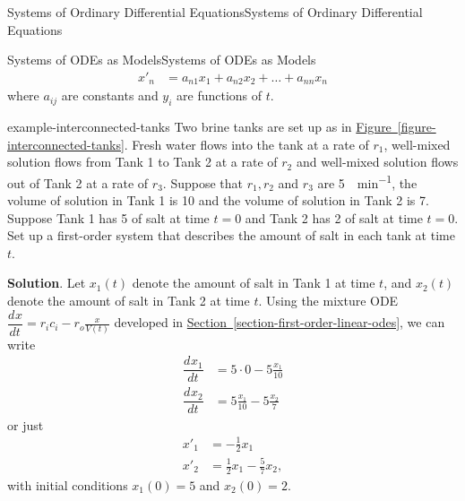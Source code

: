 \documentclass[10pt,]{book}
\numberwithin{equation}{section}
\newcommand{\dv}[3][]{\dfrac{d^{#1} #2}{d #3^{#1}}}
\newcommand{\amp}{&}
\begin{document}
\begin{chapterptx}{Systems of Ordinary Differential Equations}{}{Systems of Ordinary Differential Equations}{}{}
\begin{sectionptx}{Systems of ODEs as Models}{}{Systems of ODEs as Models}{}{}
\begin{align*}
x'_{n}  \amp=  a_{n1}x_{1} + a_{n2}x_{2} + \dots + a_{nn}x_{n}
\end{align*}
where \(a_{ij}\) are constants and \(y_{i}\) are functions of \(t\).%
\begin{example}{}{example-interconnected-tanks}%
\hypertarget{p-301}{}%
Two brine tanks are set up as in \hyperref[figure-interconnected-tanks]{Figure~\ref{figure-interconnected-tanks}}. Fresh water flows into the tank at a rate of \(r_{1}\), well-mixed solution flows from Tank 1 to Tank 2 at a rate of \(r_{2}\) and well-mixed solution flows out of Tank 2 at a rate of \(r_{3}\). Suppose that \(r_{1}, r_{2}\) and  \(r_{3}\) are \SI{5}{\gallon\per\minute}, the volume of solution in Tank 1 is \SI{10}{\gallon} and the volume of solution in Tank 2 is \SI{7}{\gallon}. Suppose Tank 1 has \SI{5}{\pound} of salt at time \(t=0\) and Tank 2 has \SI{2}{\pound} of salt at time \(t=0\). Set up a first-order system that describes the amount of salt in each tank at time \(t\).%
\par\smallskip%
\noindent\textbf{Solution}.\hypertarget{solution-46}{}\quad%
\hypertarget{p-302}{}%
Let \(x_{1}(t)\) denote the amount of salt in Tank 1 at time \(t\), and \(x_{2}(t)\) denote the amount of salt in Tank 2 at time \(t\). Using the mixture ODE \(\dv{x}{t} = r_{i}c_{i}-r_{o}\frac{x}{V(t)}\) developed in \hyperref[section-first-order-linear-odes]{Section~\ref{section-first-order-linear-odes}}, we can write%
\begin{align*}
\dv{x_{1}}{t} \amp= 5\cdot0 - 5\frac{x_{1}}{10}\\
\dv{x_{2}}{t} \amp= 5\frac{x_{1}}{10}-5\frac{x_{2}}{7}
\end{align*}
or just%
\begin{align*}
x'_{1}  \amp=  -\frac{1}{2}x_{1}\\
x'_{2}  \amp=  \frac{1}{2}x_{1}-\frac{5}{7}x_{2},
\end{align*}
with initial conditions \(x_{1}(0) = 5\) and \(x_{2}(0) = 2\).%
\end{example}
\begin{figure}
\centering
{
}
\end{figure}
\end{sectionptx}
\end{chapterptx}
\end{document}
